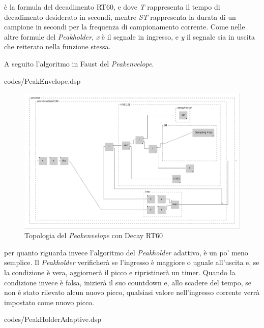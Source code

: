 è la formula del decadimento RT60, 
e dove \textit{T} rappresenta il tempo di decadimento desiderato in secondi, 
mentre \textit{ST} rappresenta la durata di un campione in secondi per la frequenza di campionamento corrente.
Come nelle altre formule del \textit{Peakholder}, \textit{x} è il segnale in ingresso, 
e \textit{y} il segnale sia in uscita che reiterato nella funzione stessa. 

A seguito l'algoritmo in Faust del \textit{Peakenvelope}.

\vspace{0.5cm} 

{codes/PeakEnvelope.dsp}

\begin{figure}[h!]
\begin{center}
    \includegraphics[width=15cm]{figures/PeakEnvelope.pdf}
    \caption{Topologia del \textit{Peakenvelope} con Decay RT60}
\end{center}
\vspace{0.5cm}
\end{figure}

per quanto riguarda invece l'algoritmo del \textit{Peakholder} adattivo, è un po' meno semplice. 
Il \textit{Peakholder} verificherà se l'ingresso è maggiore o uguale all'uscita e, 
se la condizione è vera, aggiornerà il picco e ripristinerà un timer. 
Quando la condizione invece è falsa, 
inizierà il suo countdown e, allo scadere del tempo, se non è stato rilevato alcun nuovo picco, 
qualsiasi valore nell'ingresso corrente verrà impostato come nuovo picco.


{codes/PeakHolderAdaptive.dsp}

